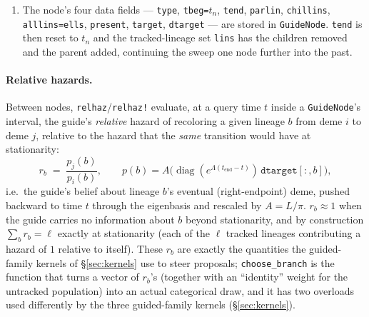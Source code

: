 \documentclass[11pt]{article}
\theoremstyle{plain}
\begin{document}
\begin{enumerate}
deme. For MERS (\texttt{GuidedMERS}'s own \texttt{knowledge!} in \texttt{mers\_guided.jl}, and
the equivalent \texttt{knowledge!} that \texttt{mers\_funs.jl} shares with \texttt{SoftMERS} and
\texttt{HardMERS}), only a typed \texttt{Sample} pins the deme (to whichever
host the metadata records); an internal \texttt{Node} does \emph{not} pin, because a MERS
coalescence can equally be a within-host transmission or a cross-host spillover, so the parent's
host is generally uncertain even once both children's beliefs are known. When \texttt{knowledge!}
returns false, \texttt{assimil!} instead \emph{fuses} the children's (already left-endpoint
propagated) beliefs:
\[
\texttt{parprob}[i] \;\propto\; \pi(i)\prod_{c\in\text{children}}\frac{\texttt{chilprobs}[i,c]}{\pi(i)},
\]
normalized over $i$. This is a product-of-experts (independent-evidence) pooling rule: each
child's belief is treated as an independent likelihood for the parent's deme, expressed relative to
the guide's own stationary distribution $\pi$ so that $\pi$ is not multiply counted as a prior once
per child. (When a node has no children under this scheme --- \texttt{isempty(chilprobs)} --- the
parent belief simply defaults to $\pi$ itself.)
\item The node's four data fields --- \texttt{type}, \texttt{tbeg=$t_n$}, \texttt{tend},
\texttt{parlin}, \texttt{chillins}, \texttt{alllins=ells}, \texttt{present}, \texttt{target},
\texttt{dtarget} --- are stored in \texttt{GuideNode}. \texttt{tend} is then reset to $t_n$ and the
tracked-lineage set \texttt{lins} has the children removed and the parent added, continuing the
sweep one node further into the past.
\end{enumerate}

\paragraph{Relative hazards.} Between nodes, \texttt{relhaz}/\texttt{relhaz!} evaluate, at a query
time $t$ inside a \texttt{GuideNode}'s interval, the guide's \emph{relative} hazard of recoloring a
given lineage $b$ from deme $i$ to deme $j$, relative to the hazard that the \emph{same}
transition would have at stationarity:
\[
r_b \;=\; \frac{p_j(b)}{p_i(b)}, \qquad p(b) = A\bigl(\operatorname{diag}(e^{\Lambda(t_{\mathrm{end}}-t)})\, \texttt{dtarget}[:,b]\bigr),
\]
i.e.\ the guide's belief about lineage $b$'s eventual (right-endpoint) deme, pushed backward to
time $t$ through the eigenbasis and rescaled by $A=L/\pi$. $r_b\approx 1$ when the guide carries no
information about $b$ beyond stationarity, and by construction $\sum_b r_b = \ell$ exactly at
stationarity (each of the $\ell$ tracked lineages contributing a hazard of $1$ relative to itself).
These $r_b$ are exactly the quantities the guided-family kernels of \S\ref{sec:kernels} use to
steer proposals; \texttt{choose\_branch} is the function that turns a vector of $r_b$'s (together
with an ``identity'' weight for the untracked population) into an actual categorical draw, and it
has two overloads used differently by the three guided-family kernels (\S\ref{sec:kernels}).
\end{document}
